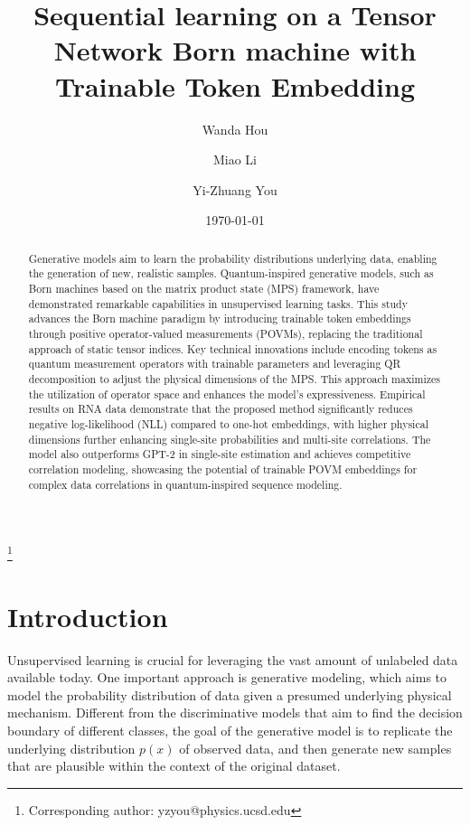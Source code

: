 \documentclass[aps,prb,twocolumn,superscriptaddress]{revtex4-2}
\begin{document}
\title{Sequential learning on a Tensor Network Born machine with Trainable Token Embedding}

\author{Wanda Hou}
\author{Miao Li}
\author{Yi-Zhuang You}
\thanks{Corresponding author: yzyou@physics.ucsd.edu}
\date{\today}

\begin{abstract}
 Generative models aim to learn the probability distributions underlying data, enabling the generation of new, realistic samples. Quantum-inspired generative models, such as Born machines based on the matrix product state (MPS) framework, have demonstrated remarkable capabilities in unsupervised learning tasks. This study advances the Born machine paradigm by introducing trainable token embeddings through positive operator-valued measurements (POVMs), replacing the traditional approach of static tensor indices. Key technical innovations include encoding tokens as quantum measurement operators with trainable parameters and leveraging QR decomposition to adjust the physical dimensions of the MPS. This approach maximizes the utilization of operator space and enhances the model’s expressiveness. Empirical results on RNA data demonstrate that the proposed method significantly reduces negative log-likelihood (NLL) compared to one-hot embeddings, with higher physical dimensions further enhancing single-site probabilities and multi-site correlations. The model also outperforms GPT-2 in single-site estimation and achieves competitive correlation modeling, showcasing the potential of trainable POVM embeddings for complex data correlations in quantum-inspired sequence modeling.
\end{abstract}

\maketitle

\section{Introduction}

Unsupervised learning is crucial for leveraging the vast amount of unlabeled data available today. One important approach is generative modeling, which aims to model the probability distribution of data given a presumed underlying physical mechanism\cite{lecun2015deep,2019RvMP...91d5002C}. Different from the discriminative models that aim to find the decision boundary of different classes, the goal of the generative model is to replicate the underlying distribution $p(x)$ of observed data, and then generate new samples that are plausible within the context of the original dataset. 
\end{document}

